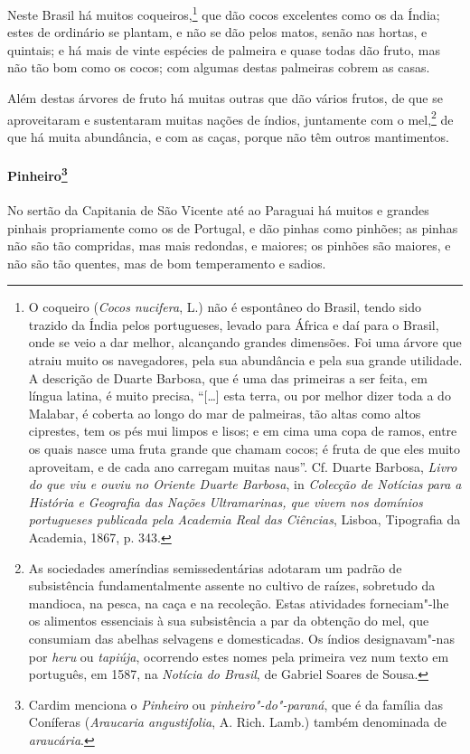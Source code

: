 Neste Brasil há muitos coqueiros,\footnote{ O coqueiro (\textit{Cocos
nucifera}, L.) não é espontâneo do Brasil, tendo sido trazido da Índia
pelos portugueses, levado para África e daí para o Brasil, onde se veio
a dar melhor, alcançando grandes dimensões. Foi uma árvore que atraiu
muito os navegadores, pela sua abundância e pela sua grande utilidade.
A descrição de Duarte Barbosa, que é uma das primeiras a ser feita, em
língua latina, é muito precisa, ``[\ldots{}] esta terra, ou por
melhor dizer toda a do Malabar, é coberta ao longo do mar de palmeiras,
tão altas como altos ciprestes, tem os pés mui limpos e lisos; e em
cima uma copa de ramos, entre os quais nasce uma fruta grande que
chamam cocos; é fruta de que eles muito aproveitam, e de cada ano
carregam muitas naus''. Cf. Duarte Barbosa, \textit{Livro do
que viu e ouviu no Oriente Duarte Barbosa}, in \textit{Colecção de
Notícias para a História e Geografia das Nações Ultramarinas, que vivem
nos domínios portugueses publicada pela Academia Real das Ciências}, 
Lisboa, Tipografia da Academia, 1867, p. 343.} que dão cocos
excelentes como os da Índia; estes de ordinário se plantam, e não se
dão pelos matos, senão nas hortas, e quintais; e há mais de vinte
espécies de palmeira e quase todas dão fruto, mas não tão bom como os
cocos; com algumas destas palmeiras cobrem as casas.

 Além destas árvores de fruto há muitas outras que dão vários frutos, de
que se aproveitaram e sustentaram muitas nações de índios, juntamente
com o mel,\footnote{ As sociedades ameríndias semissedentárias
adotaram um padrão de subsistência fundamentalmente assente no
cultivo de raízes, sobretudo da mandioca, na pesca, na caça e na
recoleção. Estas atividades forneciam"-lhe os alimentos essenciais à
sua subsistência a par da obtenção do mel, que consumiam das abelhas
selvagens e domesticadas. Os índios designavam"-nas por \textit{heru} ou
\textit{tapiúja}, ocorrendo estes nomes pela primeira vez num texto em
português, em 1587, na \textit{Notícia do Brasil}, de Gabriel Soares de
Sousa.} de que há muita abundância, e com as caças, porque não têm outros mantimentos.

\paragraph{Pinheiro\footnote{ Cardim menciona o \textit{Pinheiro} ou
\textit{pinheiro"-do"-paraná}, que é da família das Coníferas
(\textit{Araucaria angustifolia}, A. Rich. Lamb.) também denominada de
\textit{araucária}.}} No sertão da Capitania de São Vicente 
até ao Paraguai há muitos e grandes pinhais propriamente como os de
Portugal, e dão pinhas como pinhões; as pinhas não são tão compridas,
mas mais redondas, e maiores; os pinhões são maiores, e não são tão
quentes, mas de bom temperamento e sadios.

